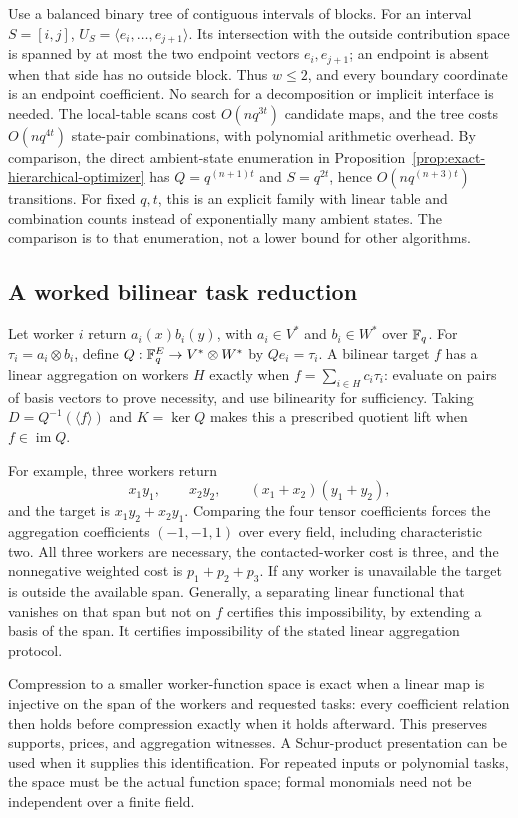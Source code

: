 Use a balanced binary tree of contiguous intervals of blocks.  For an interval
$S=[i,j]$, $U_S=\langle e_i,\ldots,e_{j+1}\rangle$.  Its intersection
with the outside contribution space is spanned by at most the two endpoint
vectors $e_i,e_{j+1}$; an endpoint is absent when that side has no outside
block.  Thus $w\leq2$, and every boundary coordinate is an endpoint
coefficient.  No search for a decomposition or implicit interface is needed.
The local-table scans cost $O(nq^{3t})$ candidate maps, and the tree costs
$O(nq^{4t})$ state-pair combinations, with polynomial arithmetic overhead.
By comparison, the direct ambient-state enumeration in
Proposition~\ref{prop:exact-hierarchical-optimizer} has
$Q=q^{(n+1)t}$ and $S=q^{2t}$, hence $O(nq^{(n+3)t})$ transitions.
For fixed $q,t$, this is an explicit family with linear table and combination
counts instead of exponentially many ambient states.  The comparison is to
that enumeration, not a lower bound for other algorithms.

\subsection{A worked bilinear task reduction}

Let worker $i$ return $a_i(x)b_i(y)$, with $a_i\in V^*$ and $b_i\in W^*$
over $\mathbb F_q$.  For $\tau_i=a_i\otimes b_i$, define
$Q:\mathbb F_q^E\to V^*\otimes W^*$ by $Qe_i=\tau_i$.
A bilinear target $f$ has a linear aggregation on workers $H$ exactly when
$f=\sum_{i\in H}c_i\tau_i$: evaluate on pairs of basis vectors to prove
necessity, and use bilinearity for sufficiency.  Taking
$D=Q^{-1}(\langle f\rangle)$ and $K=\ker Q$ makes this a prescribed
quotient lift when $f\in\operatorname{im}Q$.

For example, three workers return
\[
 x_1y_1,\qquad x_2y_2,\qquad (x_1+x_2)(y_1+y_2),
\]
and the target is $x_1y_2+x_2y_1$.  Comparing the four tensor coefficients
forces the aggregation coefficients $(-1,-1,1)$ over every field, including
characteristic two.  All three workers are necessary, the contacted-worker
cost is three, and the nonnegative weighted cost is $p_1+p_2+p_3$.
If any worker is unavailable the target is outside the available span.
Generally, a separating linear functional that vanishes on that span but
not on $f$ certifies this impossibility, by extending a basis of the span.
It certifies impossibility of the stated linear aggregation protocol.

Compression to a smaller worker-function space is exact when a linear map
is injective on the span of the workers and requested tasks: every coefficient
relation then holds before compression exactly when it holds afterward.
This preserves supports, prices, and aggregation witnesses.  A Schur-product
presentation can be used when it supplies this identification.  For repeated
inputs or polynomial tasks, the space must be the actual function space;
formal monomials need not be independent over a finite field.

